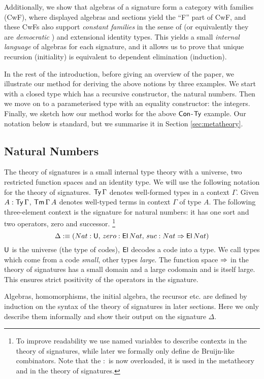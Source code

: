\documentclass[acmsmall,screen]{acmart}
\begin{document}
Additionally, we show that algebras of a signature form a category
with families (CwF), where displayed algebras and sections yield the
``F'' part of CwF, and these CwFs also support \emph{constant
  families} in the sense of \cite[p.~74]{forsberg-phd} (or
equivalently they are \emph{democratic} \cite{clairambault2014biequivalence}) and extensional
identity types. This yields a small \emph{internal language} of
algebras for each signature, and it allows us to prove that unique
recursion (initiality) is equivalent to dependent elimination (induction).

In the rest of the introduction, before giving an overview of the
paper, we illustrate our method for deriving the above notions by
three examples. We start with a closed type which has a recursive
constructor, the natural numbers. Then we move on to a parameterised
type with an equality constructor: the integers. Finally, we sketch
how our method works for the above $\mathsf{Con}$-$\mathsf{Ty}$ example. Our notation
below is standard, but we summarise it in Section
\ref{sec:metatheory}.

\subsection{Natural Numbers}
\label{sec:naturals}

The theory of signatures is a small internal type theory with a
universe, two restricted function spaces and an identity type. We will
use the following notation for the theory of signatures. $\mathsf{Ty}\,\Gamma$
denotes well-formed types in a context $\Gamma$. Given
$A:\mathsf{Ty}\,\Gamma$, $\mathsf{Tm}\,\Gamma\,A$ denotes well-typed terms in context
$\Gamma$ of type $A$. The following three-element context is the
signature for natural numbers: it has one sort and two operators, zero
and successor.
\footnote{To improve readability we use named variables to describe
  contexts in the theory of signatures, while later we formally only define
  de Bruijn-like combinators. Note that the $:$ is now overloaded, it
  is used in the metatheory and in the theory of signatures.}
\[
\Delta :\equiv (Nat:\mathsf{U},\,zero:\mathsf{El}\,Nat,\,suc:Nat\Rightarrow \mathsf{El}\,Nat)
\]
$\mathsf{U}$ is the universe (the type of codes), $\mathsf{El}$ decodes a code into a
type. We call types which come from a code {\em small}, other types
{\em large}. The function space $\Rightarrow$ in the theory of signatures
has a small domain and a large codomain and is itself large. This
ensures strict positivity of the operators in the signature.

Algebras, homomorphisms, the initial algebra, the recursor etc. are
defined by induction on the syntax of the theory of signatures in
later sections. Here we only describe them informally and show their
output on the signature $\Delta$.
\end{document}
